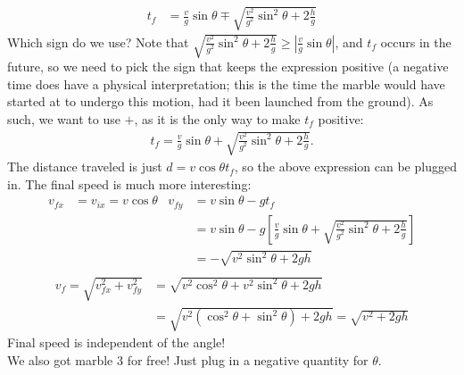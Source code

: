 \documentclass[]{article}
\begin{document}
\begin{TeacherMargin}
\begin{align*}
	t_{f} & = \frac{v}{g}\sin\theta \mp \sqrt{\frac{v^{2}}{g^{2}}\sin^{2}\theta + 2\frac{h}{g}}
\end{align*}
Which sign do we use? Note that $\sqrt{\frac{v^{2}}{g^{2}}\sin^{2}\theta + 2\frac{h}{g}} \geq |\frac{v}{g}\sin\theta|$, and $t_{f}$ occurs in the future, so we need to pick the sign that keeps the expression positive (a negative time does have a physical interpretation; this is the time the marble would have started at to undergo this motion, had it been launched from the ground). As such, we want to use $+$, as it is the only way to make $t_{f}$ positive:
\begin{align*}
	t_{f} = \frac{v}{g}\sin\theta + \sqrt{\frac{v^{2}}{g^{2}}\sin^{2}\theta + 2\frac{h}{g}}.
\end{align*}
\noindent The distance traveled is just $d = v\cos\theta t_{f}$, so the above expression can be plugged in. The final speed is much more interesting:
\begin{align*}
	v_{fx} & = v_{ix} = v\cos\theta & v_{fy} & = v\sin\theta - gt_{f} \\
	& & & = v\sin\theta - g \left[\frac{v}{g}\sin\theta + \sqrt{\frac{v^{2}}{g^{2}}\sin^{2}\theta + 2\frac{h}{g}}\right] \\
	& & & = - \sqrt{v^{2}\sin^{2}\theta + 2gh} \\
\end{align*}
\vspace{-1cm}
\begin{align*}
	v_{f} = \sqrt{v_{fx}^{2}+v_{fy}^{2}} & = \sqrt{v^{2}\cos^{2}\theta + v^{2}\sin^{2}\theta+2gh} \\
	& = \sqrt{v^{2}\left(\cos^{2}\theta + \sin^{2}\theta\right)+2gh} = \sqrt{v^{2}+2gh}
\end{align*}
Final speed is independent of the angle! \\
\noindent We also got marble 3 for free! Just plug in a negative quantity for $\theta$.
\end{TeacherMargin}
\end{document}
